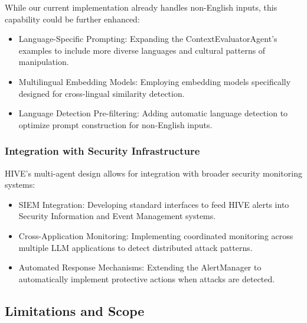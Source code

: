\documentclass[manuscript,screen,review]{acmart}
\begin{document}
While our current implementation already handles non-English inputs, this capability could be further enhanced:

\begin{itemize}
    \item Language-Specific Prompting: Expanding the ContextEvaluatorAgent's examples to include more diverse languages and cultural patterns of manipulation.
    
    \item Multilingual Embedding Models: Employing embedding models specifically designed for cross-lingual similarity detection.
    
    \item Language Detection Pre-filtering: Adding automatic language detection to optimize prompt construction for non-English inputs.
\end{itemize}

\subsubsection{Integration with Security Infrastructure}

HIVE's multi-agent design allows for integration with broader security monitoring systems:

\begin{itemize}
    \item SIEM Integration: Developing standard interfaces to feed HIVE alerts into Security Information and Event Management systems.
    
    \item Cross-Application Monitoring: Implementing coordinated monitoring across multiple LLM applications to detect distributed attack patterns.
    
    \item Automated Response Mechanisms: Extending the AlertManager to automatically implement protective actions when attacks are detected.
\end{itemize}

\subsection{Limitations and Scope}
\label{sec:limitations}
\end{document}
